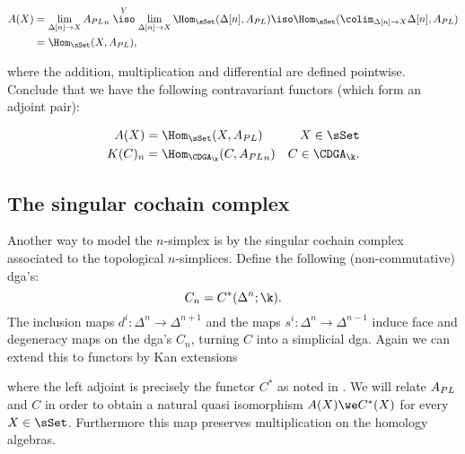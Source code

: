 \begin{align*}
	A(X) &= \lim_{\Delta[n] \to X} \Apl_n \stackrel{Y}{\iso} \lim_{\Delta[n] \to X} \Hom_\sSet(\Delta[n], \Apl) \iso \Hom_\sSet(\colim_{\Delta[n] \to X}\Delta[n], \Apl) \\
	&= \Hom_\sSet(X, \Apl),
\end{align*}

where the addition, multiplication and differential are defined pointwise. Conclude that we have the following contravariant functors (which form an adjoint pair):

\begin{align*}
	A(X) &= \Hom_\sSet(X, \Apl) & X \in \sSet \\
	K(C)_n &= \Hom_{\CDGA_\k}(C, \Apl_n) & C \in \CDGA_\k.
\end{align*}


\subsection{The singular cochain complex}

Another way to model the $n$-simplex is by the singular cochain complex associated to the topological $n$-simplices. Define the following (non-commutative) dga's:
$$ C_n = C^\ast(\Delta^n; \k). $$
The inclusion maps $d^i : \Delta^n \to \Delta^{n+1}$ and the maps $s^i: \Delta^n \to \Delta^{n-1}$ induce face and degeneracy maps on the dga's $C_n$, turning $C$ into a simplicial dga. Again we can extend this to functors by Kan extensions


where the left adjoint is precisely the functor $C^\ast$ as noted in \cite{felix}. We will relate ${A_{PL}}$ and $C$ in order to obtain a natural quasi isomorphism $A(X) \we C^\ast(X)$ for every $X \in \sSet$. Furthermore this map preserves multiplication on the homology algebras.